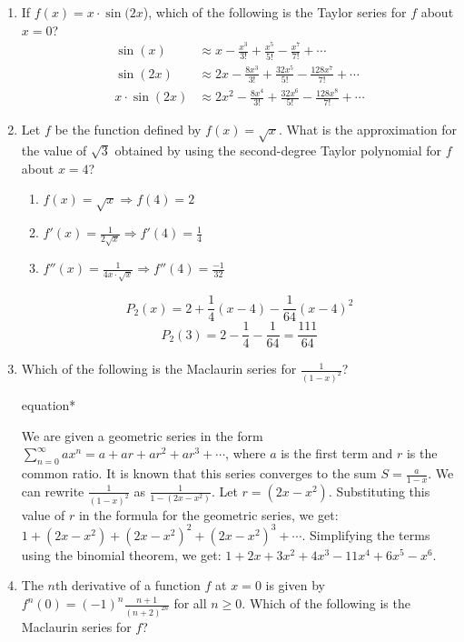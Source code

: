 \documentclass[12pt]{article}
\begin{document}
\begin{enumerate}
	\item If $f(x)=x \cdot \sin(2x$), which of the following is the Taylor series for $f$ about $x=0$?
	      \begin{align*}
	      	\sin(x)          & \approx x - \frac{x^3}{3!} + \frac{x^5}{5!} - \frac{x^7}{7!} + \cdots                  \\
	      	\sin(2x)         & \approx 2x - \frac{8x^3}{3!} + \frac{32x^5}{5!} - \frac{128x^7}{7!} + \cdots           \\
	      	x \cdot \sin(2x) & \approx \boxed{2x^2 - \frac{8x^4}{3!} + \frac{32x^6}{5!} - \frac{128x^8}{7!} + \cdots} 
	      \end{align*}
	\item Let $f$ be the function defined by $f(x)=\sqrt{x}$. What is the approximation for the value of $\sqrt{3}$ obtained by using the second-degree Taylor polynomial for $f$ about $x=4$?
	      \begin{enumerate}
	      	\item $f(x) = \sqrt{x} \Longrightarrow f(4) = 2$
	      	\item $f'(x) = \frac{1}{2\sqrt{x}} \Longrightarrow f'(4) = \frac{1}{4}$
	      	\item $f''(x) = \frac{1}{4x\cdot\sqrt{x}} \Longrightarrow f''(4) = \frac{-1}{32}$
	      \end{enumerate}
	      $$P_{2}(x) = 2 + \frac{1}{4}(x-4) -\frac{1}{64} (x-4)^2$$
	      $$P_{2}(3) = 2- \frac{1}{4} - \frac{1}{64} = \boxed{\frac{111}{64}} $$
	\item Which of the following is the Maclaurin series for $\frac{1}{(1-x)^2}$?
	      \begin{empheq}[box=\tcbhighmath]{equation*}
	      	\parbox{6in}{We are given a geometric series in the form $\sum_{n=0}^{\infty}ax^n = a + ar + ar^2 + ar^3 + \cdots$, where $a$ is the first term and $r$ is the common ratio. It is known that this series converges to the sum $S=\frac{a}{1-x}$. We can rewrite $\frac{1}{(1-x)^2}$ as $\frac{1}{1-(2x-x^2)}$. Let $r = (2x-x^2)$. Substituting this value of $r$ in the formula for the geometric series, we get:
	      		$1 + (2x-x^2) + (2x-x^2)^2 + (2x-x^2)^3 + \cdots$. Simplifying the terms using the binomial theorem, we get: $\boxed{1+ 2x + 3x^2 + 4x^3} -11x^4 +6x^5-x^6$.}
	      \end{empheq}
	\item The $n$th derivative of a function $f$ at $x=0$ is given by $f^n(0)=(-1)^n \frac{n+1}{(n+2)^{2n}}$ for all $n\geq0$. Which of the following is the Maclaurin series for $f$?

\end{enumerate}
\end{document}
